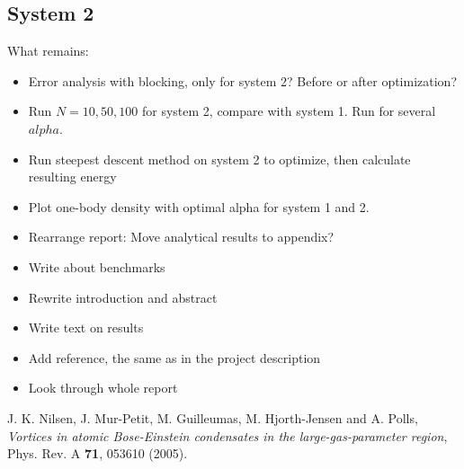 \documentclass[english, a4paper]{article}
\begin{document}
\subsection{System 2}




What remains:
\begin{itemize}
 \item Error analysis with blocking, only for system 2? Before or after optimization?
 \item Run $N = 10, 50, 100$ for system 2, compare with system 1. Run for several $alpha$.
 \item Run steepest descent method on system 2 to optimize, then calculate resulting energy
 \item Plot one-body density with optimal alpha for system 1 and 2. 
 \item Rearrange report: Move analytical results to appendix?
 \item Write about benchmarks
 \item Rewrite introduction and abstract
 \item Write text on results 
 \item Add reference, the same as in the project description
 \item Look through whole report
\end{itemize}




































 















\begin{thebibliography}{9}

  J. K. Nilsen, J. Mur-Petit, M. Guilleumas, M. Hjorth-Jensen and A. Polls, 
  \textit{Vortices in atomic Bose-Einstein condensates in the large-gas-parameter region}, 
  Phys. Rev. A {\bf 71}, 053610 (2005).

\end{thebibliography}
\end{document}
